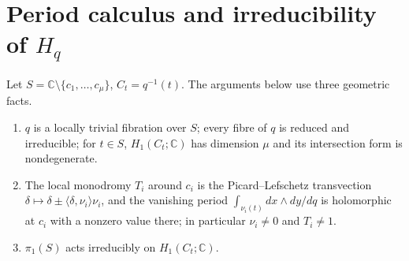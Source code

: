 \documentclass[11pt]{article}
\numberwithin{equation}{section}
\theoremstyle{definition}
\theoremstyle{remark}
\newcommand{\C}{\mathbb C}\newcommand{\Q}{\mathbb Q}\newcommand{\R}{\mathbb R}\newcommand{\Z}{\mathbb Z}
\newcommand{\Hq}{H_q}
\begin{document}
\section{Period calculus and irreducibility of \texorpdfstring{$\Hq$}{Hq}}

Let $S=\C\setminus\{c_1,\dots,c_\mu\}$, $C_t=q^{-1}(t)$. The arguments below
use three geometric facts.
\begin{enumerate}[label=\textup{(G\arabic*)},leftmargin=2.8em]
\item $q$ is a locally trivial fibration over $S$; every fibre of $q$ is
 reduced and irreducible; for $t\in S$, $H_1(C_t;\C)$ has dimension $\mu$ and
 its intersection form is nondegenerate.
\item The local monodromy $T_i$ around $c_i$ is the Picard--Lefschetz
 transvection $\delta\mapsto\delta\pm\langle\delta,\nu_i\rangle\nu_i$, and the vanishing
 period $\int_{\nu_i(t)}dx\wedge dy/dq$ is holomorphic at $c_i$ with a nonzero
 value there; in particular $\nu_i\ne0$ and $T_i\ne1$.
\item $\pi_1(S)$ acts irreducibly on $H_1(C_t;\C)$.
\end{enumerate}
\end{document}
